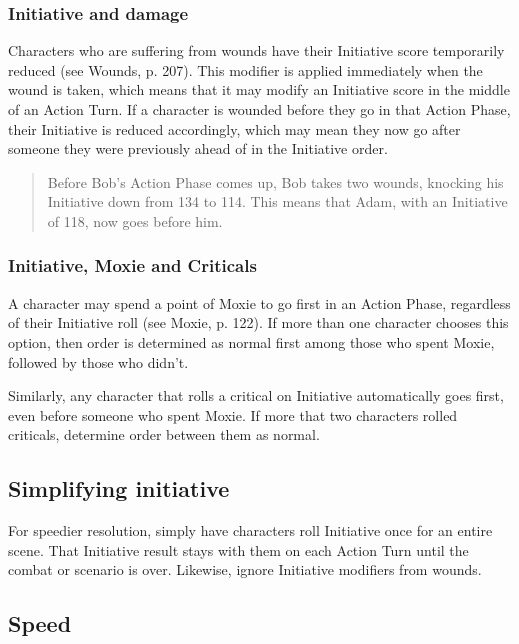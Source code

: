 \subsubsection{Initiative and damage}

Characters who are suffering from wounds have their Initiative score temporarily reduced (see Wounds, p. 207). This modifier is applied immediately when the wound is taken, which means that it may modify an Initiative score in the middle of an Action Turn. If a character is wounded before they go in that Action Phase, their Initiative is reduced accordingly, which may mean they now go after someone they were previously ahead of in the Initiative order.

\begin{quotation}
Before Bob’s Action Phase comes up, Bob takes two wounds, knocking his Initiative down from 134 to 114. This means that Adam, with an Initiative of 118, now goes before him.
\end{quotation}

\subsubsection{Initiative, Moxie and Criticals}

A character may spend a point of Moxie to go first in an Action Phase, regardless of their Initiative roll (see Moxie, p. 122). If more than one character chooses this option, then order is determined as normal first among those who spent Moxie, followed by those who didn’t.

Similarly, any character that rolls a critical on Initiative automatically goes first, even before someone who spent Moxie. If more that two characters rolled criticals, determine order between them as normal.

\subsection{Simplifying initiative}
\label{sec:simplifying-init}

For speedier resolution, simply have characters roll Initiative once for an entire scene. That Initiative result stays with them on each Action Turn until the combat or scenario is over. Likewise, ignore Initiative modifiers from wounds.

\subsection{Speed}
\label{sec:speed}

